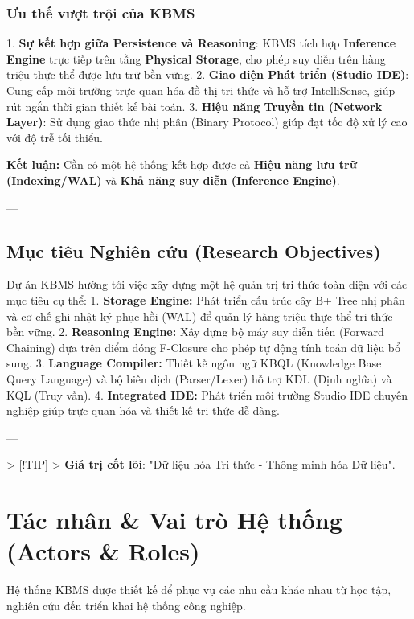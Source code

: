 \subsubsection{Ưu thế vượt trội của KBMS}

1.  \textbf{Sự kết hợp giữa Persistence và Reasoning}: KBMS tích hợp \textbf{Inference Engine} trực tiếp trên tầng \textbf{Physical Storage}, cho phép suy diễn trên hàng triệu thực thể được lưu trữ bền vững.
2.  \textbf{Giao diện Phát triển (Studio IDE)}: Cung cấp môi trường trực quan hóa đồ thị tri thức và hỗ trợ IntelliSense, giúp rút ngắn thời gian thiết kế bài toán.
3.  \textbf{Hiệu năng Truyền tin (Network Layer)}: Sử dụng giao thức nhị phân (Binary Protocol) giúp đạt tốc độ xử lý cao với độ trễ tối thiểu.

\textbf{Kết luận:} Cần có một hệ thống kết hợp được cả \textbf{Hiệu năng lưu trữ (Indexing/WAL)} và \textbf{Khả năng suy diễn (Inference Engine)}.

---

\subsection{Mục tiêu Nghiên cứu (Research Objectives)}

Dự án KBMS hướng tới việc xây dựng một hệ quản trị tri thức toàn diện với các mục tiêu cụ thể:
1.  \textbf{Storage Engine:} Phát triển cấu trúc cây B+ Tree nhị phân và cơ chế ghi nhật ký phục hồi (WAL) để quản lý hàng triệu thực thể tri thức bền vững.
2.  \textbf{Reasoning Engine:} Xây dựng bộ máy suy diễn tiến (Forward Chaining) dựa trên điểm đóng F-Closure cho phép tự động tính toán dữ liệu bổ sung.
3.  \textbf{Language Compiler:} Thiết kế ngôn ngữ KBQL (Knowledge Base Query Language) và bộ biên dịch (Parser/Lexer) hỗ trợ KDL (Định nghĩa) và KQL (Truy vấn).
4.  \textbf{Integrated IDE:} Phát triển môi trường Studio IDE chuyên nghiệp giúp trực quan hóa và thiết kế tri thức dễ dàng.

---

> [!TIP]
> \textbf{Giá trị cốt lõi}: "Dữ liệu hóa Tri thức - Thông minh hóa Dữ liệu".

\section{Tác nhân & Vai trò Hệ thống (Actors & Roles)}

Hệ thống KBMS được thiết kế để phục vụ các nhu cầu khác nhau từ học tập, nghiên cứu đến triển khai hệ thống công nghiệp.

